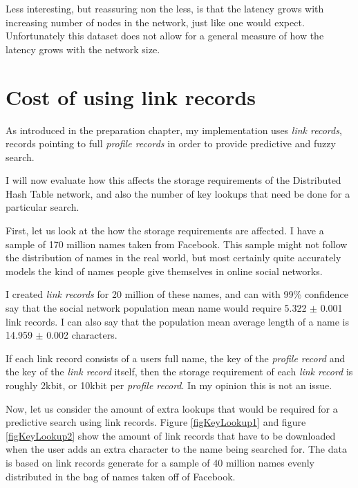 Less interesting, but reassuring non the less, is that the latency grows with increasing number of nodes in the network, just like one would expect. Unfortunately this dataset does not allow for a general measure of how the latency grows with the network size.

\section{Cost of using link records}
As introduced in the preparation chapter, my implementation uses \emph{link records}, records pointing to full \emph{profile records} in order to provide predictive and fuzzy search.

I will now evaluate how this affects the storage requirements of the Distributed Hash Table network, and also the number of key lookups that need be done for a particular search.

First, let us look at the how the storage requirements are affected.
I have a sample of 170 million names taken from Facebook. This sample might not follow the distribution of names in the real world, but most certainly quite accurately models the kind of names people give themselves in online social networks.

I created \emph{link records} for 20 million of these names, and can with 99\% confidence say that the social network population mean name would require 5.322 $\pm$ 0.001 link records. I can also say that the population mean average length of a name is 14.959 $\pm$ 0.002 characters.

If each link record consists of a users full name, the key of the \emph{profile record} and the key of the \emph{link record} itself, then the storage requirement of each \emph{link record} is roughly 2kbit, or 10kbit per \emph{profile record}.
In my opinion this is not an issue.

Now, let us consider the amount of extra lookups that would be required for a predictive search using link records. Figure \ref{figKeyLookup1} and figure \ref{figKeyLookup2} show the amount of link records that have to be downloaded when the user adds an extra character to the name being searched for. The data is based on link records generate for a sample of 40 million names evenly distributed in the bag of names taken off of Facebook.

